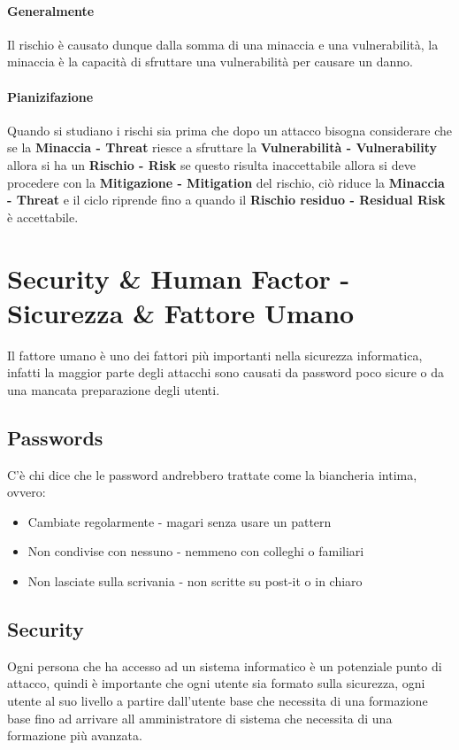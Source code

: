     \paragraph{Generalmente} Il rischio è causato dunque dalla somma di una minaccia e una vulnerabilità, la minaccia è la capacità di sfruttare una vulnerabilità per causare un danno. 
    \paragraph{Pianizifazione} Quando si studiano i rischi sia prima che dopo un attacco bisogna considerare che se la \textbf{Minaccia - Threat} riesce a sfruttare la \textbf{Vulnerabilità - Vulnerability} allora si ha un \textbf{Rischio - Risk} se questo risulta inaccettabile allora si deve procedere con la \textbf{Mitigazione - Mitigation} del rischio, ciò riduce la \textbf{Minaccia - Threat} e il ciclo riprende fino a quando il \textbf{Rischio residuo - Residual Risk} è accettabile.

\section{Security \& Human Factor - Sicurezza \& Fattore Umano}
    Il fattore umano è uno dei fattori più importanti nella sicurezza informatica, infatti la maggior parte degli attacchi sono causati da password poco sicure o da una mancata preparazione degli utenti.
    \subsection{Passwords}
        C'è chi dice che le password andrebbero trattate come la biancheria intima, ovvero:
        \begin{itemize}
            \item Cambiate regolarmente - magari senza usare un pattern
            \item Non condivise con nessuno - nemmeno con colleghi o familiari
            \item Non lasciate sulla scrivania - non scritte su post-it o in chiaro
        \end{itemize}
    \subsection{Security}
        Ogni persona che ha accesso ad un sistema informatico è un potenziale punto di attacco, quindi è importante che ogni utente sia formato sulla sicurezza, ogni utente al suo livello a partire dall'utente base che necessita di una formazione base fino ad arrivare all amministratore di sistema che necessita di una formazione più avanzata.